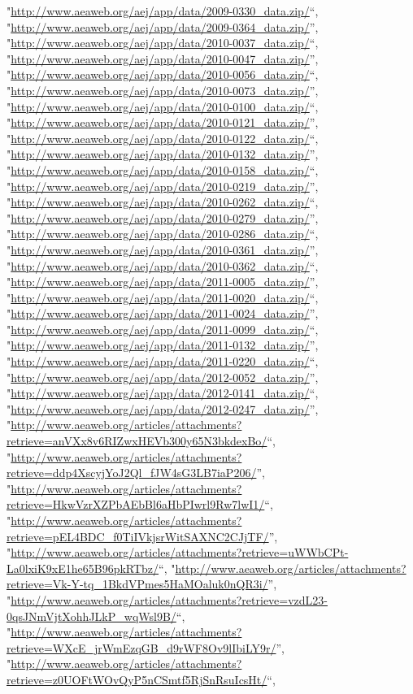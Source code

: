 \documentclass[]{article}
\begin{document}
\begin{itemize}
  "\url{http://www.aeaweb.org/aej/app/data/2009-0330_data.zip/}``,
  "\url{http://www.aeaweb.org/aej/app/data/2009-0364_data.zip/}'',
  "\url{http://www.aeaweb.org/aej/app/data/2010-0037_data.zip/}``,
  "\url{http://www.aeaweb.org/aej/app/data/2010-0047_data.zip/}'',
  "\url{http://www.aeaweb.org/aej/app/data/2010-0056_data.zip/}``,
  "\url{http://www.aeaweb.org/aej/app/data/2010-0073_data.zip/}'',
  "\url{http://www.aeaweb.org/aej/app/data/2010-0100_data.zip/}``,
  "\url{http://www.aeaweb.org/aej/app/data/2010-0121_data.zip/}'',
  "\url{http://www.aeaweb.org/aej/app/data/2010-0122_data.zip/}``,
  "\url{http://www.aeaweb.org/aej/app/data/2010-0132_data.zip/}'',
  "\url{http://www.aeaweb.org/aej/app/data/2010-0158_data.zip/}``,
  "\url{http://www.aeaweb.org/aej/app/data/2010-0219_data.zip/}'',
  "\url{http://www.aeaweb.org/aej/app/data/2010-0262_data.zip/}``,
  "\url{http://www.aeaweb.org/aej/app/data/2010-0279_data.zip/}'',
  "\url{http://www.aeaweb.org/aej/app/data/2010-0286_data.zip/}``,
  "\url{http://www.aeaweb.org/aej/app/data/2010-0361_data.zip/}'',
  "\url{http://www.aeaweb.org/aej/app/data/2010-0362_data.zip/}``,
  "\url{http://www.aeaweb.org/aej/app/data/2011-0005_data.zip/}'',
  "\url{http://www.aeaweb.org/aej/app/data/2011-0020_data.zip/}``,
  "\url{http://www.aeaweb.org/aej/app/data/2011-0024_data.zip/}'',
  "\url{http://www.aeaweb.org/aej/app/data/2011-0099_data.zip/}``,
  "\url{http://www.aeaweb.org/aej/app/data/2011-0132_data.zip/}'',
  "\url{http://www.aeaweb.org/aej/app/data/2011-0220_data.zip/}``,
  "\url{http://www.aeaweb.org/aej/app/data/2012-0052_data.zip/}'',
  "\url{http://www.aeaweb.org/aej/app/data/2012-0141_data.zip/}``,
  "\url{http://www.aeaweb.org/aej/app/data/2012-0247_data.zip/}'',
  "\url{http://www.aeaweb.org/articles/attachments?retrieve=anVXx8v6RIZwxHEVb300y65N3bkdexBo/}``,
  "\url{http://www.aeaweb.org/articles/attachments?retrieve=ddp4XscyjYoJ2Ql_fJW4sG3LB7iaP206/}'',
  "\url{http://www.aeaweb.org/articles/attachments?retrieve=HkwVzrXZPbAEbBl6aHbPIwrl9Rw7lwI1/}``,
  "\url{http://www.aeaweb.org/articles/attachments?retrieve=pEL4BDC_f0TiIVkjsrWitSAXNC2CJjTF/}'',
  "\url{http://www.aeaweb.org/articles/attachments?retrieve=uWWbCPt-La0lxiK9xE1he65B96pkRTbz/}``,
  "\url{http://www.aeaweb.org/articles/attachments?retrieve=Vk-Y-tq_1BkdVPmes5HaMOaluk0nQR3i/}'',
  "\url{http://www.aeaweb.org/articles/attachments?retrieve=vzdL23-0qsJNmVjtXohhJLkP_wqWsl9B/}``,
  "\url{http://www.aeaweb.org/articles/attachments?retrieve=WXcE_jrWmEzqGB_d9rWF8Ov9lIbiLY9r/}'',
  "\url{http://www.aeaweb.org/articles/attachments?retrieve=z0UOFtWOvQyP5nCSmtf5RjSnRsuIcsHt/}``,

\end{itemize}
\end{document}
